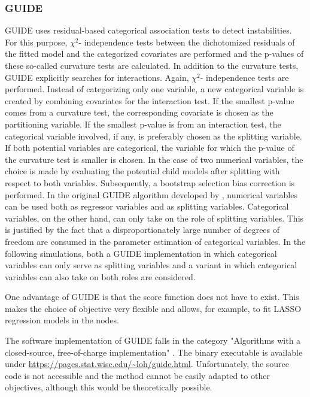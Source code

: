 \subsubsection{GUIDE}
GUIDE \citep{.2002} uses residual-based categorical association tests to detect instabilities. For this purpose, $\chi^2$- independence tests between the dichotomized residuals of the fitted model and the categorized covariates are performed and the p-values of these so-called curvature tests are calculated. In addition to the curvature tests, GUIDE explicitly searches for interactions.  Again, $\chi^2$- independence tests are performed. Instead of categorizing only one variable, a new categorical variable is created by combining covariates for the interaction test. If the smallest p-value comes from a curvature test, the corresponding covariate is chosen as the partitioning variable. If the smallest p-value is from an interaction test, the categorical variable involved, if any, is preferably chosen as the splitting variable. If both potential variables are categorical, the variable for which the p-value of the curvature test is smaller is chosen. In the case of two numerical variables, the choice is made by evaluating the potential child models after splitting with respect to both variables.
Subsequently, a bootstrap selection bias correction is performed.
In the original GUIDE algorithm developed by \citep{.2002}, numerical variables can be used both as regressor variables and as splitting variables. Categorical variables, on the other hand, can only take on the role of splitting variables. This is justified by the fact that a disproportionately large number of degrees of freedom are consumed in the parameter estimation of categorical variables.
In the following simulations, both a GUIDE implementation in which categorical variables can only serve as splitting variables and a variant in which categorical variables can also take on both roles are considered. 

One advantage of GUIDE is that the score function does not have to exist. This makes the choice of objective very flexible and allows, for example, to fit LASSO regression models  in the nodes.

The software implementation of GUIDE falls in the category "Algorithms with a closed-source, free-of-charge implementation" \citep{Loh.2014}. The binary executable is available under \url{https://pages.stat.wisc.edu/~loh/guide.html}.  Unfortunately, the source code is not accessible and the method cannot be easily adapted to other objectives, although this would be theoretically possible.


